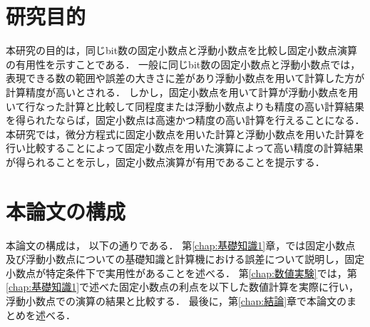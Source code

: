 \section{研究目的}
本研究の目的は，同じbit数の固定小数点と浮動小数点を比較し固定小数点演算の有用性を示すことである．
一般に同じbit数の固定小数点と浮動小数点では，表現できる数の範囲や誤差の大きさに差があり浮動小数点を用いて計算した方が計算精度が高いとされる．
しかし，固定小数点を用いて計算が浮動小数点を用いて行なった計算と比較して同程度または浮動小数点よりも精度の高い計算結果を得られたならば，固定小数点は高速かつ精度の高い計算を行えることになる．
本研究では，微分方程式に固定小数点を用いた計算と浮動小数点を用いた計算を行い比較することによって固定小数点を用いた演算によって高い精度の計算結果が得られることを示し，固定小数点演算が有用であることを提示する．


\section{本論文の構成}
本論文の構成は， 以下の通りである．
第\ref{chap:基礎知識1}章，では固定小数点及び浮動小数点についての基礎知識と計算機における誤差について説明し，固定小数点が特定条件下で実用性があることを述べる．
第\ref{chap:数値実験}では，第\ref{chap:基礎知識1}で述べた固定小数点の利点を以下した数値計算を実際に行い，浮動小数点での演算の結果と比較する．
最後に，第\ref{chap:結論}章で本論文のまとめを述べる．

